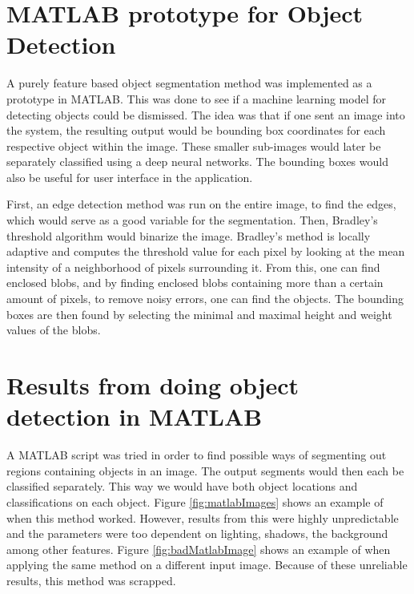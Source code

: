 \section{MATLAB prototype for Object Detection}
\label{sec:ODmatlab}
A purely feature based object segmentation method was implemented as a prototype in MATLAB. This was done to see if a machine learning model for detecting objects could be dismissed. 
The idea was that if one sent an image into the system, the resulting output would be bounding box coordinates for each respective object within the image. These smaller sub-images would later be separately classified using a deep neural networks. The bounding boxes would also be useful for user interface in the application. 

First, an edge detection method was run on the entire image, to find the edges, which would serve as a good variable for the segmentation. Then, Bradley's threshold algorithm \cite{Bradley} would binarize the image. Bradley's method is locally adaptive and computes the threshold value for each pixel by looking at the mean intensity of a neighborhood of pixels surrounding it.  From this, one can find enclosed blobs, and by finding enclosed blobs containing more than a certain amount of pixels, to remove noisy errors, one can find the objects. The bounding boxes are then found by selecting the minimal and maximal height and weight values of the blobs.

\section{Results from doing object detection in MATLAB}
\label{sec:ODresults}
A MATLAB script was tried in order to find possible ways of segmenting out regions containing objects in an image. The output segments would then each be classified separately. This way we would have both object locations and classifications on each object. Figure \ref{fig:matlabImages} shows an example of when this method worked. However, results from this were highly unpredictable and the parameters were too dependent on lighting, shadows, the background among other features. Figure \ref{fig:badMatlabImage} shows an example of when applying the same method on a different input image. Because of these unreliable results, this method was scrapped.


